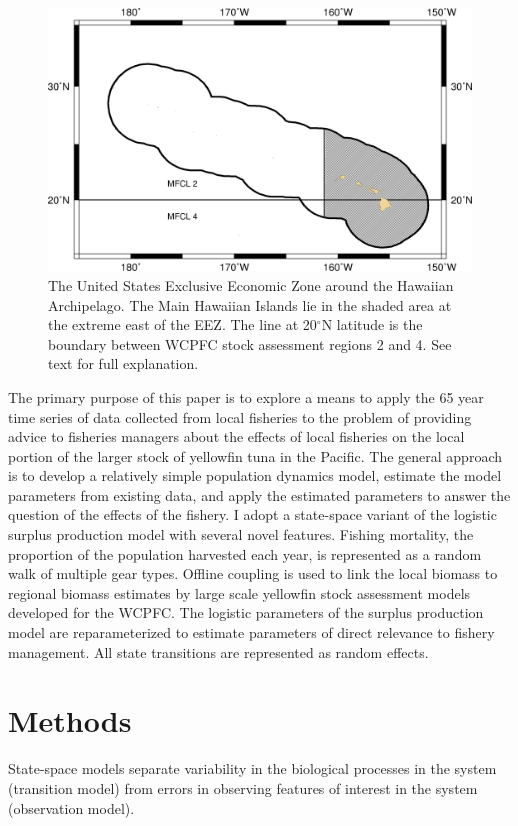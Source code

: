\documentclass[12pt,letterpaper]{article}
\renewcommand\deg[1]{$^\circ$#1}
\begin{document}
\begin{figure}
\begin{center}
\includegraphics[width=\textwidth]{./HI_regions.png}
\caption{\label{fig:mhimap}
The United States Exclusive Economic Zone around the Hawaiian
Archipelago. The Main Hawaiian Islands lie in the shaded area at the
extreme east of the EEZ. The line at 20\deg{N} latitude is the
boundary between WCPFC stock assessment regions 2 and 4. See text for
full explanation.
}
\end{center}
\end{figure}

The primary purpose of this paper is to explore a means to apply the 65
year time series of
data collected from local fisheries to the problem of
providing advice to fisheries
managers about the effects of local fisheries on the local portion of
the larger stock of yellowfin tuna in the Pacific.
The general approach is to develop a relatively simple population
dynamics model, estimate the model parameters from existing
data, and apply the estimated parameters to answer the question of the
effects of the fishery.
I adopt a state-space variant of
the logistic surplus production model with several novel features.
Fishing mortality, the proportion of the population harvested each
year, is represented as a random walk of multiple gear types.
Offline coupling is used to link the local biomass to regional
biomass estimates by large scale yellowfin stock assessment models
developed for the WCPFC.
The logistic parameters of the surplus production model are
reparameterized to estimate parameters of direct relevance to fishery
management. All state transitions are represented as random effects.

\section*{Methods}
\label{sec:models}
State-space models separate variability in the biological
processes in the system (transition model)
from errors in observing features of interest
in the system (observation model).
\end{document}
